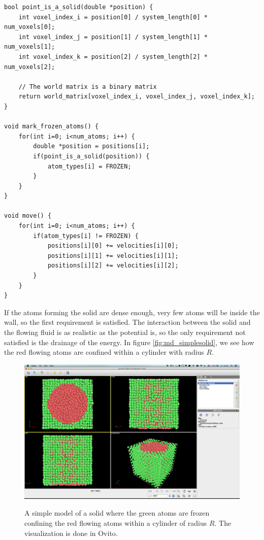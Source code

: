 \begin{lstlisting}[caption=Example code showing how to mark atoms within a solid., label=lst:md_simple_solid]
bool point_is_a_solid(double *position) {
	int voxel_index_i = position[0] / system_length[0] * num_voxels[0];
	int voxel_index_j = position[1] / system_length[1] * num_voxels[1];
	int voxel_index_k = position[2] / system_length[2] * num_voxels[2];

	// The world matrix is a binary matrix
	return world_matrix[voxel_index_i, voxel_index_j, voxel_index_k];
}

void mark_frozen_atoms() {
	for(int i=0; i<num_atoms; i++) {
		double *position = positions[i];
		if(point_is_a_solid(position)) {
			atom_types[i] = FROZEN;
		}
	}
}

void move() {
	for(int i=0; i<num_atoms; i++) {
		if(atom_types[i] != FROZEN) {
			positions[i][0] += velocities[i][0];
			positions[i][1] += velocities[i][1];
			positions[i][2] += velocities[i][2];
		}
	}
}
\end{lstlisting}
If the atoms forming the solid are dense enough, very few atoms will be inside the wall, so the first requirement is satisfied. The interaction between the solid and the flowing fluid is as realistic as the potential is, so the only requirement not satisfied is the drainage of the energy. In figure \ref{fig:md_simplesolid}, we see how the red flowing atoms are confined within a cylinder with radius $R$. 

\begin{figure}[h]
\begin{center}
\includegraphics[width=1.0\textwidth, trim=0cm 0cm 0cm 0cm, clip]{MD/figures/solid_model.png}
\label{fig:md_simple_solid}
\end{center}
\caption{A simple model of a solid where the green atoms are frozen confining the red flowing atoms within a cylinder of radius $R$. The visualization is done in Ovito.}
\end{figure}

